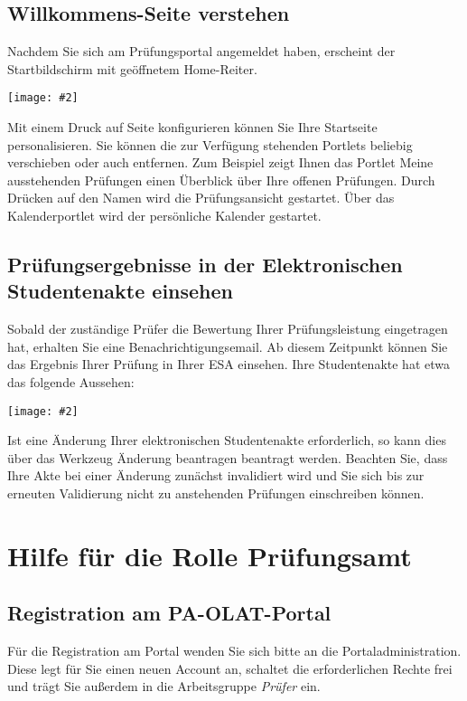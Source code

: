 \documentclass[a4paper,11pt]{article}
\newcommand{\bild}[2]{
    \begin{center}\texttt{[image: \#2]}\end{center}
}
\newcommand{\knopf}[1]{{\sc #1}}
\begin{document}
\subsection{Willkommens-Seite verstehen}

Nachdem Sie sich am Prüfungsportal angemeldet haben, erscheint der
Startbildschirm mit geöffnetem \knopf{Home}-Reiter.

\bild{.9}{Startbildschirm}

Mit einem Druck auf \knopf{Seite konfigurieren} können Sie Ihre Startseite
personalisieren. Sie können die zur Verfügung stehenden Portlets beliebig
verschieben oder auch entfernen. Zum Beispiel zeigt Ihnen das Portlet
\knopf{Meine ausstehenden Prüfungen} einen Überblick über Ihre offenen
Prüfungen.  Durch Drücken auf den Namen wird die Prüfungsansicht gestartet.
Über das Kalenderportlet wird der persönliche Kalender gestartet.

\subsection{Prüfungsergebnisse in der Elektronischen Studentenakte einsehen}

Sobald der zuständige Prüfer die Bewertung Ihrer Prüfungsleistung eingetragen
hat, erhalten Sie eine Benachrichtigungsemail. Ab diesem Zeitpunkt können Sie
das Ergebnis Ihrer Prüfung in Ihrer ESA einsehen.  Ihre Studentenakte hat etwa
das folgende Aussehen:

\bild{.9}{ESA-Ansicht}

Ist eine Änderung Ihrer elektronischen Studentenakte erforderlich, so kann
dies über das Werkzeug \knopf{Änderung beantragen} beantragt werden. Beachten
Sie, dass Ihre Akte bei einer Änderung zunächst invalidiert wird und Sie sich
bis zur erneuten Validierung nicht zu anstehenden Prüfungen einschreiben
können.

\clearpage
\section{Hilfe für die Rolle Prüfungsamt}

\subsection{Registration am PA-OLAT-Portal}

Für die Registration am Portal wenden Sie sich bitte an die
Portaladministration.  Diese legt für Sie einen neuen Account an, schaltet die
erforderlichen Rechte frei und trägt Sie außerdem in die Arbeitsgruppe {\em
  Prüfer} ein.
\end{document}
